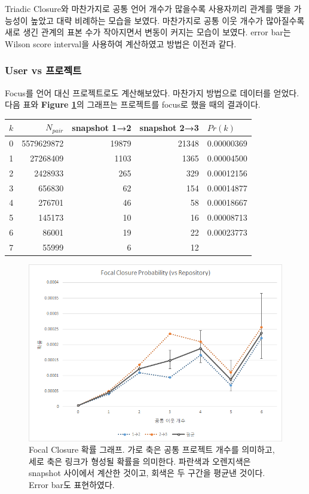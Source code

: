 \documentclass[10pt, a4paper, titlepage]{article}
\begin{document}
Triadic Closure와 마찬가지로 공통 언어 개수가 많을수록 사용자끼리 관계를 맺을 가능성이 높았고 대략 비례하는 모습을 보였다. 마찬가지로 공통 이웃 개수가 많아질수록 새로 생긴 관계의 표본 수가 작아지면서 변동이 커지는 모습이 보였다.
error bar는 Wilson score interval을 사용하여 계산하였고 방법은 이전과 같다.



\subsubsection{User vs 프로젝트}

Focus를 언어 대신 프로젝트로도 계산해보았다. 마찬가지 방법으로 데이터를 얻었다. 다음 표와 {\bf Figure \ref{fig:focalrepo}}의 그래프는 프로젝트를 focus로 했을 때의 결과이다.

\begin{longtable}{|c|r|r|r|l|}

\hline
\rowcolor[gray]{0.8}
$k$ & 
$N_{pair}$ & 
snapshot 1→2 &
snapshot 2→3 & 
$Pr(k)$ \\ \hline
0 &
5579629872 &
19879 &
21348 &
0.00000369 \\ \hline
1 &
27268409 &
1103 &
1365 &
0.00004500 \\ \hline
2 &
2428933 &
265 &
329 &
0.00012156 \\ \hline
3 &
656830 &
62 &
154 &
0.00014877 \\ \hline
4 &
276701 &
46 &
58 &
0.00018667 \\ \hline
5 &
145173 &
10 &
16 &
0.00008713 \\ \hline
6 &
86001 &
19 &
22 &
0.00023773 \\ \hline
7 &
55999 &
6 &
12 &
 \\ \hline

\end{longtable}


\begin{figure}
\includegraphics[width=\textwidth]{image07}
\caption{Focal Closure 확률 그래프. 가로 축은 공통 프로젝트 개수를 의미하고, 세로 축은 링크가 형성될 확률을 의미한다. 파란색과 오렌지색은 snapshot 사이에서 계산한 것이고, 회색은 두 구간을 평균낸 것이다. Error bar도 표현하였다.}
\label{fig:focalrepo}
\end{figure}
\end{document}
